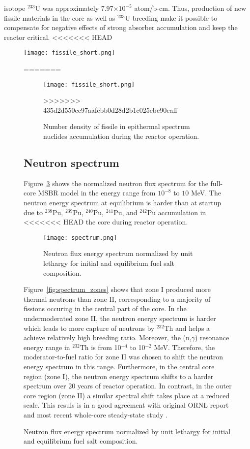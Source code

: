 isotope $^{233}$U was approximately 7.97$\times10^{-5}$ atom/b-cm. Thus, 
production of new fissile materials in the core as well as $^{233}$U breeding 
make it possible to compensate for negative effects of strong absorber 
accumulation and keep the reactor critical.
<<<<<<< HEAD
\begin{figure}[htp!] %
  \centering
  \texttt{[image: fissile\_short.png]}
  \caption{Number density of fissile in epithermal spectrum nuclides 
accumulation during the reactor operation.}
=======
\begin{figure}[htp!] %
  \texttt{[image: fissile\_short.png]}
  \caption{Number density of fissile in epithermal spectrum nuclides 
  accumulation during the reactor operation.}
>>>>>>> 435d2d550cc97aafcbb0d28d2b1c025ebc90eaff
  \label{fig:fissile_short}
\end{figure}

\subsection{Neutron spectrum}
Figure~\ref{fig:spectrum} shows the normalized neutron flux spectrum for the 
full-core \gls{MSBR} model in the energy range from $10^{-8}$ to $10$ MeV. The 
neutron energy spectrum at equilibrium is harder than at startup due to 
$^{238}$Pu, $^{239}$Pu, $^{240}$Pu, $^{241}$Pu, and $^{242}$Pu accumulation in 
<<<<<<< HEAD
the core during reactor operation. 
\begin{figure}[ht!] %
  \centering
  \texttt{[image: spectrum.png]} 
  \caption{Neutron flux energy spectrum normalized by unit lethargy for initial 
and equilibrium fuel salt composition.}
  \label{fig:spectrum}
\end{figure}
Figure~\ref{fig:spectrum_zones} shows that zone I produced more thermal neutrons 
than zone II, corresponding to a majority of fissions occuring in the central 
part of the core. In the undermoderated zone II, the neutron energy spectrum is 
harder which leads to more capture of neutrons by $^{232}$Th and helps a achieve 
relatively high breeding ratio. Moreover, the (n,$\gamma$) resonance energy 
range in $^{232}$Th is from 10$^{-4}$ to 10$^{-2}$ MeV. Therefore, the 
moderator-to-fuel ratio for zone II was chosen to shift the neutron energy 
spectrum in this range. Furthermore, in the central core region (zone I), the 
neutron energy spectrum shifts to a harder spectrum over 20 years of reactor 
operation. In contrast, in the outer core region (zone II) a similar spectral 
shift takes place at a reduced scale. This resuls is in a good agreement with 
original ORNL report \cite{robertson_conceptual_1971} and most recent whole-core 
steady-state study \cite{park_whole_2015}.


\end{figure}
